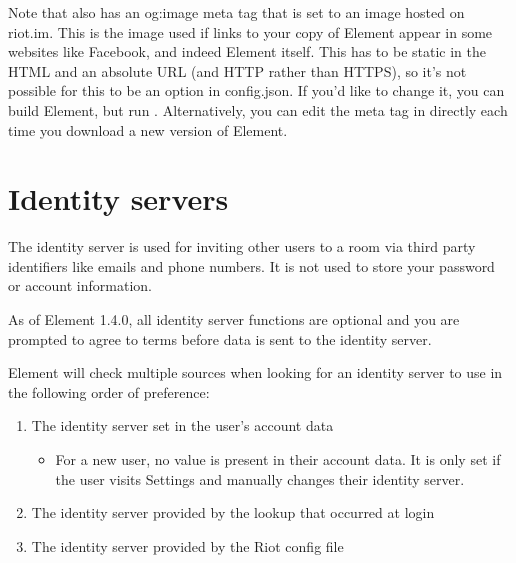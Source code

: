 \documentclass[letterpaper,10pt,openany,oneside,english]{sphinxmanual}
\begin{document}
\sphinxAtStartPar
Note that  also has an og:image meta tag that is set to an image
hosted on riot.im. This is the image used if links to your copy of Element
appear in some websites like Facebook, and indeed Element itself. This has to be
static in the HTML and an absolute URL (and HTTP rather than HTTPS), so it’s
not possible for this to be an option in config.json. If you’d like to change
it, you can build Element, but run
.
Alternatively, you can edit the  meta tag in  directly
each time you download a new version of Element.


\section{Identity servers}
\label{\detokenize{config:id2}}
\sphinxAtStartPar
The identity server is used for inviting other users to a room via third party
identifiers like emails and phone numbers. It is not used to store your password
or account information.

\sphinxAtStartPar
As of Element 1.4.0, all identity server functions are optional and you are
prompted to agree to terms before data is sent to the identity server.

\sphinxAtStartPar
Element will check multiple sources when looking for an identity server to use in
the following order of preference:
\begin{enumerate}
%
\item {} 
\sphinxAtStartPar
The identity server set in the user’s account data
\begin{itemize}
\item {} 
\sphinxAtStartPar
For a new user, no value is present in their account data. It is only set
if the user visits Settings and manually changes their identity server.

\end{itemize}

\item {} 
\sphinxAtStartPar
The identity server provided by the  lookup that occurred at
login

\item {} 
\sphinxAtStartPar
The identity server provided by the Riot config file

\end{enumerate}
\end{document}
